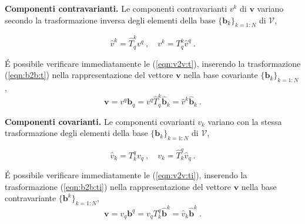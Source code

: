 \vspace{5pt} \noindent
\textbf{Componenti contravarianti.} Le componenti contravarianti $v^k$ di $\bm{v}$ variano secondo la trasformazione inversa degli elementi della base $\{ \bm{b}_k \}_{k=1:N}$ di $\mathcal{V}$,
\begin{fBox}
\begin{equation}\label{eqn:v2v:t}
 \hat{v}^k = \hat{T}^k_q v^q \ , \quad v^k = T^k_q \hat{v}^q \ .
\end{equation}
\end{fBox}
\'E possibile verificare immediatamente le (\ref{eqn:v2v:t}), inserendo la trasformazione (\ref{eqn:b2b:t}) nella rappresentazione del vettore $\bm{v}$ nella base covariante $\{ \bm{b}_k \}_{k=1:N}$,
 \begin{equation}
  \bm{v} = v^q \bm{b}_q = v^q \hat{T}^k_q \bm{\hat{b}}_k = \hat{v}^k \bm{\hat{b}}_k \ .
 \end{equation}

\vspace{5pt} \noindent
\textbf{Componenti covarianti.} Le componenti covarianti $v_k$ variano con la stessa trasformazione
  degli elementi  della base
 $\{ \bm{b}_k \}_{k=1:N}$ di $\mathcal{V}$,
 \begin{fBox}
 \begin{equation}\label{eqn:v2v:ti}
  \hat{v}_k = T^q_k v_q \ , \quad v_k = \hat{T}^q_k \hat{v}_q \ .
 \end{equation}
 \end{fBox}
 \'E possibile verificare immediatamente le (\ref{eqn:v2v:ti}), inserendo la trasformazione (\ref{eqn:b2b:ti}) nella rappresentazione del vettore $\bm{v}$ nella base contravariante $\{ \bm{b}^k \}_{k=1:N}$,
  \begin{equation}
  \bm{v} = v_q \bm{b}^q = v_q T^q_k \bm{\hat{b}}^k = \hat{v}_k \bm{\hat{b}}^k \ .
  \end{equation}

